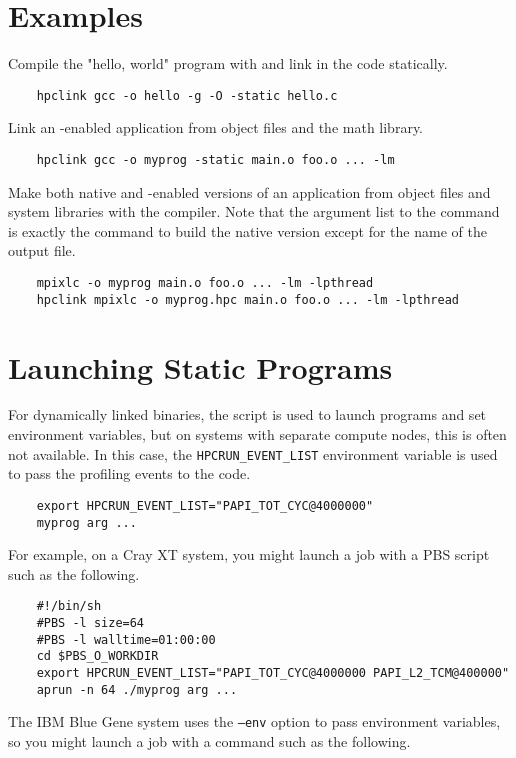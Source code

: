 \documentclass[english]{article}
\begin{document}
\section{Examples}

Compile the "hello, world" program with  and link in the
 code statically.

\begin{verbatim}
    hpclink gcc -o hello -g -O -static hello.c
\end{verbatim}
%
Link an -enabled application from object files and the
math library.

\begin{verbatim}
    hpclink gcc -o myprog -static main.o foo.o ... -lm
\end{verbatim}
%
Make both native and -enabled versions of an application from object files and system libraries with the  compiler.
Note that the argument list to the  command is exactly the command to build the native version except for the name of the output file.

\begin{verbatim}
    mpixlc -o myprog main.o foo.o ... -lm -lpthread
    hpclink mpixlc -o myprog.hpc main.o foo.o ... -lm -lpthread
\end{verbatim}


\section{Launching Static Programs}

For dynamically linked binaries, the  script is used to launch programs and set environment variables, but on systems with separate compute nodes, this is often not available.
In this case, the \texttt{HPCRUN\_EVENT\_LIST} environment variable is used to pass the profiling events to the  code.

\begin{verbatim}
    export HPCRUN_EVENT_LIST="PAPI_TOT_CYC@4000000"
    myprog arg ...
\end{verbatim}
%
For example, on a Cray XT system, you might launch a job with a PBS
script such as the following.

\begin{verbatim}
    #!/bin/sh
    #PBS -l size=64
    #PBS -l walltime=01:00:00
    cd $PBS_O_WORKDIR
    export HPCRUN_EVENT_LIST="PAPI_TOT_CYC@4000000 PAPI_L2_TCM@400000"
    aprun -n 64 ./myprog arg ...
\end{verbatim}
%
The IBM Blue Gene system uses the \texttt{--env} option to pass
environment variables, so you might launch a job with a command
such as the following.
\end{document}
